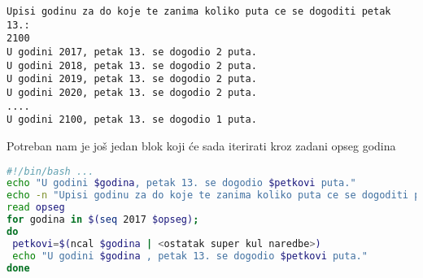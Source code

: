 \documentclass{exam}
\begin{document}
\begin{itemize}
\begin{lstlisting}[caption={Ispis}]
Upisi godinu za do koje te zanima koliko puta ce se dogoditi petak 13.:
2100
U godini 2017, petak 13. se dogodio 2 puta.
U godini 2018, petak 13. se dogodio 2 puta.
U godini 2019, petak 13. se dogodio 2 puta.
U godini 2020, petak 13. se dogodio 2 puta.
....
U godini 2100, petak 13. se dogodio 1 puta.
\end{lstlisting}

  Potreban nam je još jedan blok koji će sada iterirati kroz zadani opseg godina
  
\begin{lstlisting}[language=bash,caption={Iteracija po opsegu}]
#!/bin/bash ...
echo "U godini $godina, petak 13. se dogodio $petkovi puta."
echo -n "Upisi godinu za do koje te zanima koliko puta ce se dogoditi petak 13.: "
read opseg
for godina in $(seq 2017 $opseg);
do 
 petkovi=$(ncal $godina | <ostatak super kul naredbe>)
 echo "U godini $godina , petak 13. se dogodio $petkovi puta."
done
\end{lstlisting}
\end{itemize}
\end{document}
